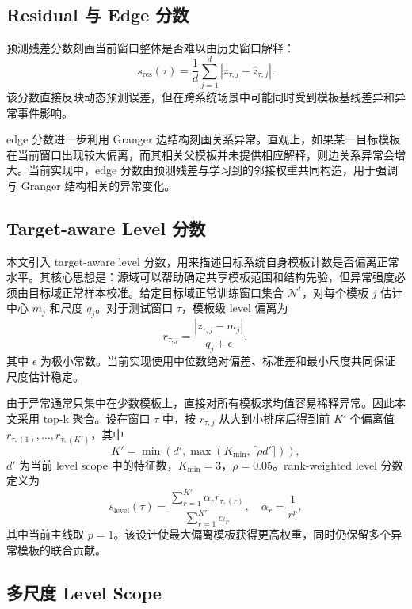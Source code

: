 \documentclass[UTF8,a4paper,zihao=-4]{ctexart}
\begin{document}
\subsection{Residual 与 Edge 分数}

预测残差分数刻画当前窗口整体是否难以由历史窗口解释：
\begin{equation}
  s_{\mathrm{res}}(\tau)=\frac{1}{d}\sum_{j=1}^{d}\left|z_{\tau,j}-\hat{z}_{\tau,j}\right|.
\end{equation}
该分数直接反映动态预测误差，但在跨系统场景中可能同时受到模板基线差异和异常事件影响。

edge 分数进一步利用 Granger 边结构刻画关系异常。直观上，如果某一目标模板在当前窗口出现较大偏离，而其相关父模板并未提供相应解释，则边关系异常会增大。当前实现中，edge 分数由预测残差与学习到的邻接权重共同构造，用于强调与 Granger 结构相关的异常变化。

\subsection{Target-aware Level 分数}

本文引入 target-aware level 分数，用来描述目标系统自身模板计数是否偏离正常水平。其核心思想是：源域可以帮助确定共享模板范围和结构先验，但异常强度必须由目标域正常样本校准。给定目标域正常训练窗口集合 $\mathcal{N}^{t}$，对每个模板 $j$ 估计中心 $m_j$ 和尺度 $q_j$。对于测试窗口 $\tau$，模板级 level 偏离为
\begin{equation}
  r_{\tau,j}=\frac{|z_{\tau,j}-m_j|}{q_j+\epsilon},
\end{equation}
其中 $\epsilon$ 为极小常数。当前实现使用中位数绝对偏差、标准差和最小尺度共同保证尺度估计稳定。

由于异常通常只集中在少数模板上，直接对所有模板求均值容易稀释异常。因此本文采用 top-k 聚合。设在窗口 $\tau$ 中，按 $r_{\tau,j}$ 从大到小排序后得到前 $K'$ 个偏离值 $r_{\tau,(1)},\ldots,r_{\tau,(K')}$，其中
\begin{equation}
  K' = \min\left(d', \max(K_{\min}, \lceil \rho d' \rceil)\right),
\end{equation}
$d'$ 为当前 level scope 中的特征数，$K_{\min}=3$，$\rho=0.05$。rank-weighted level 分数定义为
\begin{equation}
  s_{\mathrm{level}}(\tau)=\frac{\sum_{r=1}^{K'} \alpha_r r_{\tau,(r)}}{\sum_{r=1}^{K'}\alpha_r}, \quad
  \alpha_r=\frac{1}{r^{p}},
\end{equation}
其中当前主线取 $p=1$。该设计使最大偏离模板获得更高权重，同时仍保留多个异常模板的联合贡献。

\subsection{多尺度 Level Scope}
\end{document}
